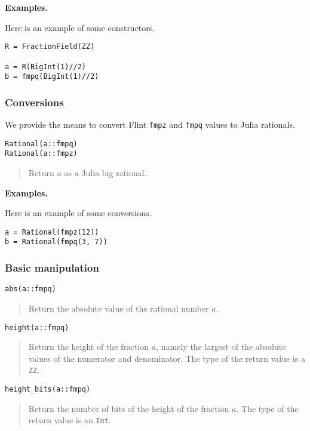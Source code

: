 \documentclass[a4paper,10pt]{article}
\newcommand{\code}{\lstinline}
\newcommand{\desc}[1]{\vspace{-3mm}\begin{quote}#1\end{quote}}
\begin{document}
{{\textbf{Examples.}

Here is an example of some constructors.

\begin{lstlisting}
R = FractionField(ZZ)

a = R(BigInt(1)//2)
b = fmpq(BigInt(1)//2)
\end{lstlisting}

\subsubsection{Conversions}

We provide the means to convert Flint \code{fmpz} and \code{fmpq} values to Julia
rationals.

\begin{lstlisting}
Rational(a::fmpq)
Rational(a::fmpz)
\end{lstlisting}

\desc{Return $a$ as a Julia big rational.}

\textbf{Examples.}

Here is an example of some conversions.

\begin{lstlisting}
a = Rational(fmpz(12))
b = Rational(fmpq(3, 7))
\end{lstlisting}

\subsubsection{Basic manipulation}

\begin{lstlisting}
abs(a::fmpq)
\end{lstlisting}

\desc{Return the absolute value of the rational number $a$.}

\begin{lstlisting}
height(a::fmpq)
\end{lstlisting}

\desc{Return the height of the fraction $a$, namely the largest of the absolute
values of the numerator and denominator. The type of the return value is a 
\code{ZZ}.}

\begin{lstlisting}
height_bits(a::fmpq)
\end{lstlisting}

\desc{Return the number of bits of the height of the fraction $a$. The type of
the return value is an \code{Int}.}

}}
\end{document}
